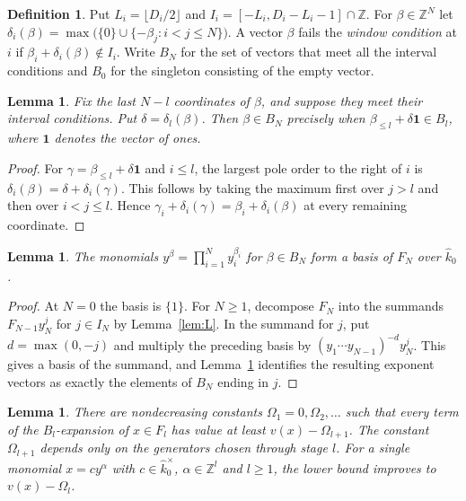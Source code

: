 \documentclass[11pt, letterpaper]{article}
\newtheorem{lemma}[theorem]{Lemma}
\theoremstyle{definition}
\newtheorem{definition}[theorem]{Definition}
\theoremstyle{remark}
\begin{document}
\begin{definition}
    \label{def:WN}
    Put $L_{i} = \lfloor D_{i}/2 \rfloor$ and $I_{i} = [-L_{i}, D_{i} - L_{i} - 1] \cap \mathbb{Z}$.
    For $\beta \in \mathbb{Z}^{N}$ let $\delta_{i}(\beta) = \max\bigl(\{0\} \cup \{-\beta_{j} : i < j \le N\}\bigr)$.
    A vector $\beta$ fails the \emph{window condition} at $i$ if $\beta_{i} + \delta_{i}(\beta) \notin I_{i}$.
    Write $B_{N}$ for the set of vectors that meet all the interval conditions and $B_{0}$ for the singleton consisting of the empty vector.
\end{definition}

\begin{lemma}
    \label{lem:W}
    Fix the last $N - l$ coordinates of $\beta$, and suppose they meet their interval conditions.
    Put $\delta = \delta_{l}(\beta)$.
    Then $\beta \in B_{N}$ precisely when $\beta_{\le l} + \delta\mathbf{1} \in B_{l}$, where $\mathbf{1}$ denotes the vector of ones.
\end{lemma}

\begin{proof}
    For $\gamma = \beta_{\le l} + \delta\mathbf{1}$ and $i \le l$, the largest pole order to the right of $i$ is $\delta_{i}(\beta) = \delta + \delta_{i}(\gamma)$.
    This follows by taking the maximum first over $j > l$ and then over $i < j \le l$.
    Hence $\gamma_{i} + \delta_{i}(\gamma) = \beta_{i} + \delta_{i}(\beta)$ at every remaining coordinate.
\end{proof}

\begin{lemma}
    \label{lem:WB}
    The monomials $y^{\beta} = \prod_{i = 1}^{N} y_{i}^{\beta_{i}}$ for $\beta \in B_{N}$ form a basis of $F_{N}$ over $\widehat{k}_{0}$.
\end{lemma}

\begin{proof}
    At $N = 0$ the basis is $\{1\}$.
    For $N \ge 1$, decompose $F_{N}$ into the summands $F_{N - 1} y_{N}^{j}$ for $j \in I_{N}$ by Lemma~\ref{lem:L}.
    In the summand for $j$, put $d = \max(0, -j)$ and multiply the preceding basis by $(y_{1}\cdots y_{N - 1})^{-d} y_{N}^{j}$.
    This gives a basis of the summand, and Lemma~\ref{lem:W} identifies the resulting exponent vectors as exactly the elements of $B_{N}$ ending in $j$.
\end{proof}

\begin{lemma}
    \label{lem:WL}
    There are nondecreasing constants $\Omega_{1} = 0, \Omega_{2}, \dots$ such that every term of the $B_{l}$-expansion of $x \in F_{l}$ has value at least $v(x) - \Omega_{l + 1}$.
    The constant $\Omega_{l + 1}$ depends only on the generators chosen through stage $l$.
    For a single monomial $x = c y^{\alpha}$ with $c \in \widehat{k}_{0}^{\times}$, $\alpha \in \mathbb{Z}^{l}$ and $l \ge 1$, the lower bound improves to $v(x) - \Omega_{l}$.
\end{lemma}
\end{document}
